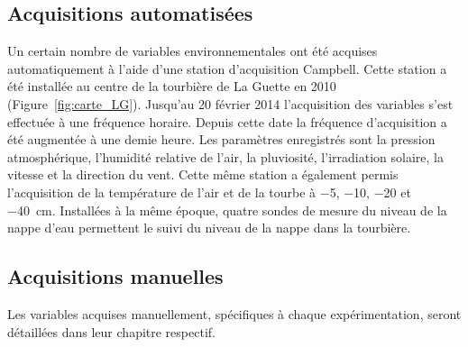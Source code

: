 \subsection{Acquisitions automatisées}

Un certain nombre de variables environnementales ont été acquises automatiquement à l'aide d'une station d'acquisition Campbell\textsuperscript{\textregistered}.
Cette station a été installée au centre de la tourbière de La Guette en 2010 (Figure~\ref{fig:carte_LG}).
Jusqu'au 20 février 2014 l'acquisition des variables s'est effectuée à une fréquence horaire.
Depuis cette date la fréquence d'acquisition a été augmentée à une demie heure.
Les paramètres enregistrés sont la pression atmosphérique, l'humidité relative de l'air, la pluviosité, l'irradiation solaire, la vitesse et la direction du vent. 
Cette même station a également permis l'acquisition de la température de l'air et de la tourbe à \num{-5}, \num{-10}, \num{-20} et \SIlist{-40}{\cm}.
Installées à la même époque, quatre sondes de mesure du niveau de la nappe d'eau permettent le suivi du niveau de la nappe dans la tourbière.

\subsection{Acquisitions manuelles}

Les variables acquises manuellement, spécifiques à chaque expérimentation, seront détaillées dans leur chapitre respectif.



